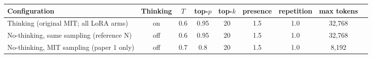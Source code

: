\begin{tabular}{lcccccccc}
\toprule
\textbf{Configuration} & \textbf{Thinking} & $T$ & top-$p$ & top-$k$ & presence & repetition & max tokens \\
\midrule
Thinking (original MIT; all LoRA arms) & on & 0.6 & 0.95 & 20 & 1.5 & 1.0 & 32{,}768 \\
No-thinking, same sampling (reference N) & off & 0.6 & 0.95 & 20 & 1.5 & 1.0 & 32{,}768 \\
No-thinking, MIT sampling (paper 1 only) & off & 0.7 & 0.8 & 20 & 1.5 & 1.0 & 8{,}192 \\
\bottomrule
\end{tabular}
